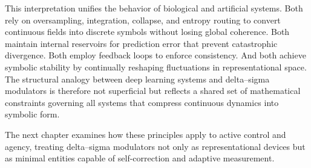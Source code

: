 This interpretation unifies the behavior of biological and artificial systems. Both rely on oversampling, integration, collapse, and entropy routing to convert continuous fields into discrete symbols without losing global coherence. Both maintain internal reservoirs for prediction error that prevent catastrophic divergence. Both employ feedback loops to enforce consistency. And both achieve symbolic stability by continually reshaping fluctuations in representational space. The structural analogy between deep learning systems and delta–sigma modulators is therefore not superficial but reflects a shared set of mathematical constraints governing all systems that compress continuous dynamics into symbolic form.

The next chapter examines how these principles apply to active control and agency, treating delta–sigma modulators not only as representational devices but as minimal entities capable of self-correction and adaptive measurement.

